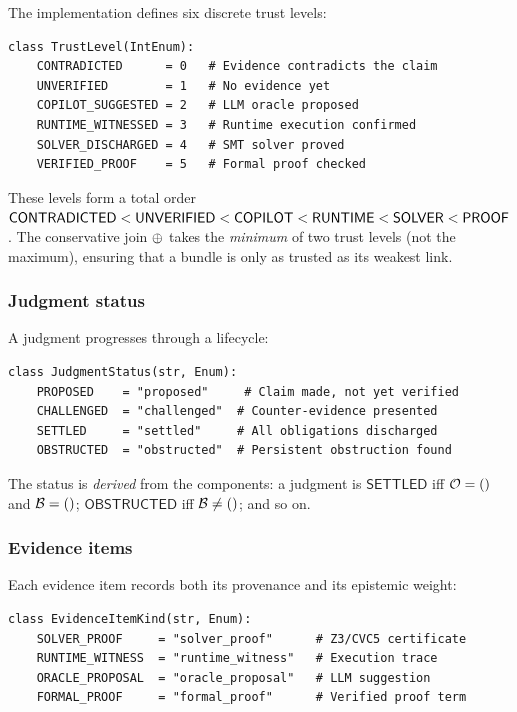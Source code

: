 \documentclass[11pt]{article}
\begin{document}
The implementation defines six discrete trust levels:

\begin{lstlisting}[caption={Trust levels (from \texttt{judgment\_terms.py}).},
  label=lst:trust]
class TrustLevel(IntEnum):
    CONTRADICTED      = 0   # Evidence contradicts the claim
    UNVERIFIED        = 1   # No evidence yet
    COPILOT_SUGGESTED = 2   # LLM oracle proposed
    RUNTIME_WITNESSED = 3   # Runtime execution confirmed
    SOLVER_DISCHARGED = 4   # SMT solver proved
    VERIFIED_PROOF    = 5   # Formal proof checked
\end{lstlisting}

These levels form a total order
$\mathsf{CONTRADICTED} < \mathsf{UNVERIFIED} < \mathsf{COPILOT} < \mathsf{RUNTIME} < \mathsf{SOLVER} < \mathsf{PROOF}$.
The conservative join $\oplus$ takes the \emph{minimum} of two trust levels
(not the maximum), ensuring that a bundle is only as trusted as its weakest
link.

\subsubsection{Judgment status}

A judgment progresses through a lifecycle:

\begin{lstlisting}[caption={Judgment status lifecycle.}, label=lst:status]
class JudgmentStatus(str, Enum):
    PROPOSED    = "proposed"     # Claim made, not yet verified
    CHALLENGED  = "challenged"  # Counter-evidence presented
    SETTLED     = "settled"     # All obligations discharged
    OBSTRUCTED  = "obstructed"  # Persistent obstruction found
\end{lstlisting}

The status is \emph{derived} from the components: a judgment is
$\mathsf{SETTLED}$ iff $\mathcal{O} = ()$ and $\mathcal{B} = ()$;
$\mathsf{OBSTRUCTED}$ iff $\mathcal{B} \neq ()$; and so on.

\subsubsection{Evidence items}

Each evidence item records both its provenance and its epistemic weight:

\begin{lstlisting}[caption={Evidence item classification.}, label=lst:evidence]
class EvidenceItemKind(str, Enum):
    SOLVER_PROOF     = "solver_proof"      # Z3/CVC5 certificate
    RUNTIME_WITNESS  = "runtime_witness"   # Execution trace
    ORACLE_PROPOSAL  = "oracle_proposal"   # LLM suggestion
    FORMAL_PROOF     = "formal_proof"      # Verified proof term
\end{lstlisting}
\end{document}
